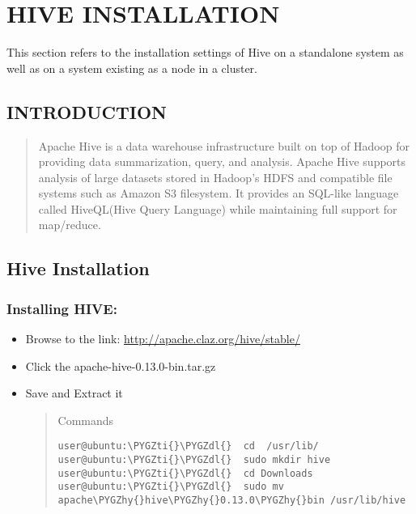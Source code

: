 \documentclass[letterpaper,10pt,english]{sphinxmanual}
\def\PYGZdl{\char`\$}
\def\PYGZhy{\char`\-}
\def\PYGZti{\char`\~}
\begin{document}
\chapter{HIVE INSTALLATION}
\label{hive:hive-installation}\label{hive::doc}
This section refers to the installation settings of Hive on a standalone system
as well as on a system existing as a node in a cluster.


\section{INTRODUCTION}
\label{hive:introduction}\begin{quote}

Apache Hive is a data warehouse infrastructure built on top of Hadoop for providing data summarization, query, and analysis. Apache Hive supports analysis of large datasets stored in Hadoop's HDFS and compatible file systems such as Amazon S3 filesystem. It provides an SQL-like language called HiveQL(Hive Query Language) while maintaining full support for map/reduce.
\end{quote}


\section{Hive Installation}
\label{hive:id1}

\subsection{Installing HIVE:}
\label{hive:installing-hive}\begin{itemize}
\item {} 
Browse to the link: \href{http://apache.claz.org/hive/stable/}{http://apache.claz.org/hive/stable/}

\item {} 
Click the apache-hive-0.13.0-bin.tar.gz

\item {} 
Save and Extract it
\begin{quote}

Commands

\begin{Verbatim}[commandchars=\\\{\}]
user@ubuntu:\PYGZti{}\PYGZdl{}  cd  /usr/lib/
user@ubuntu:\PYGZti{}\PYGZdl{}  sudo mkdir hive
user@ubuntu:\PYGZti{}\PYGZdl{}  cd Downloads
user@ubuntu:\PYGZti{}\PYGZdl{}  sudo mv apache\PYGZhy{}hive\PYGZhy{}0.13.0\PYGZhy{}bin /usr/lib/hive
\end{Verbatim}
\end{quote}

\end{itemize}
\end{document}
